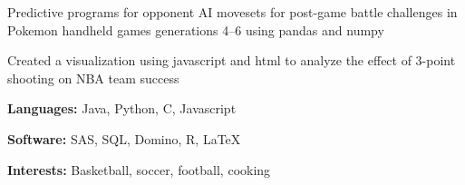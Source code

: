 \documentclass{resume}
\begin{document}
\begin{projects}
    \begin{description}
        \item Predictive programs for opponent AI movesets for post-game battle challenges in Pokemon handheld games generations 4--6 using pandas and numpy
    \end{description}
    \begin{description}
        \item Created a visualization using javascript and html to analyze the effect of 3-point shooting on NBA team success
    \end{description}

\end{projects}


\begin{skills}
    \begin{description}
	\item \textbf{Languages:} Java, Python, C, Javascript
        \item \textbf{Software:} SAS, SQL, Domino, R, LaTeX
        \item \textbf{Interests:} Basketball, soccer, football, cooking
    \end{description}
\end{skills}
\end{document}
